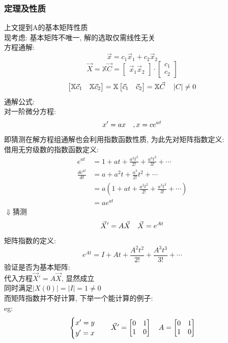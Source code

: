 \subsubsection{\large 定理及性质}
上文提到A的基本矩阵性质\\
现考虑: 基本矩阵不唯一, 解的选取仅需线性无关\\
方程通解:
\[ \vec{x} = c_1 \vec{x}_1 + c_2 \vec{x}_2 \]
\[ \vec{X} = \mathbb{X} \vec{C} =
\begin{bmatrix}
     \vec{x}_1  \vec{x}_2
\end{bmatrix}\cdot 
\begin{bmatrix}
    c_1 \\
    c_2
\end{bmatrix}
\]
\[
\begin{bmatrix}
    \mathbb{X} \vec{c}_1  & \mathbb{X}\vec{c}_2
\end{bmatrix}
=
\mathbb{X}
\begin{bmatrix}
    \vec{c}_1  & \vec{c}_2
\end{bmatrix}
=
\mathbb{X} \vec{C} \hspace*{1em} \left\lvert C\right\rvert \neq 0
\]
通解公式:\\
对一阶微分方程:
\[ x' = a x \hspace*{1em} , x = c e^{at} \]
即猜测在解方程组通解也会利用指数函数性质, 为此先对矩阵指数定义:\\
借用无穷级数的指数函数定义:
\begin{align*}
e^{at} &= 1 + at + \frac{a^2 t^2}{2!} + \frac{a^3 t^3}{3!} + \cdots    \\
\frac{de^{at}}{dt} &= a + a^2 t + \frac{a^3}{2!} t^2 + \cdots \\
    &=a (1 + at + \frac{a^2 t^2}{2!} + \frac{a^3 t^3}{3!} + \cdots)  \\
    &=a e^{at}
\end{align*}
$\Downarrow $猜测
\[ \vec{X}' = A \vec{X} \hspace*{1em}  \vec{X} = e^{At} \]
矩阵指数的定义:
\[ e^{At} = I + At + \frac{A^2 t^2}{2!} + \frac{A^3 t^3}{3!} + \cdots \]
验证是否为基本矩阵:\\
代入方程$\vec{X}' = A \vec{X} $, 显然成立\\
同时满足$\left\lvert X(0)\right\rvert  = \left\lvert I\right\rvert = 1 \neq 0$\\
而矩阵指数并不好计算, 下举一个能计算的例子:\\[1em]
eg:
\[
\begin{cases}
    x' = y \\
    y' = x
\end{cases}
\hspace*{1em}
\vec{X}' =
\begin{bmatrix}
    0 & 1 \\
    1 & 0
\end{bmatrix}
\hspace*{1em}
A =
\begin{bmatrix}
    0 & 1 \\
    1 & 0
\end{bmatrix}
\]
